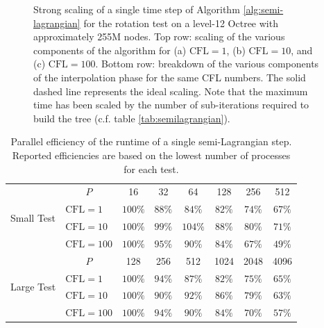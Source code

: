 \begin{figure}[htbp]
\begin{center}
	\end{center}
	\caption{Strong scaling of a single time step of Algorithm \ref{alg:semi-lagrangian} for the rotation test on a level-12 Octree with approximately 255M nodes. Top row: scaling of the various components of the algorithm for (a) $\text{CFL} = 1$, (b) $\text{CFL} = 10$, and (c) $\text{CFL} = 100$. Bottom row: breakdown of the various components of the interpolation phase for the same CFL numbers. The solid dashed line represents the ideal scaling. Note that the maximum time has been scaled by the number of sub-iterations required to build the tree (c.f. table \ref{tab:semilagrangian}).}
	\label{fig:semilagrangian_large}
\end{figure}

\begin{table}
\centering
	\begin{tabular}{|l|l|cccccc|}
	\hline
	\multirow{4}{*}{Small Test} & \multicolumn{1}{|c|}{$P$} & 16      & 32      & 64      & 128     & 256    & 512 \\
	\cline{2-8} 	                            
	                            & $\text{CFL} = 1$   & $100\%$ & $88\%$  & $84\%$  & $82\%$  & $74\%$ & $67\%$ \\
	                            & $\text{CFL} = 10$  & $100\%$ & $99\%$  & $104\%$ & $88\%$  & $80\%$ & $71\%$ \\ 	                            
	                            & $\text{CFL} = 100$ & $100\%$ & $95\%$  & $90\%$  & $84\%$  & $67\%$ & $49\%$ \\
	\hline
	\multirow{4}{*}{Large Test} & \multicolumn{1}{|c|}{$P$} & 128     & 256     & 512     & 1024    & 2048   & 4096 \\
	\cline{2-8} 	                            
	                            & $\text{CFL} = 1$   & $100\%$ & $94\%$  & $87\%$  & $82\%$  & $75\%$ & $65\%$ \\
	                            & $\text{CFL} = 10$  & $100\%$ & $90\%$  & $92\%$  & $86\%$  & $79\%$ & $63\%$ \\
	                            & $\text{CFL} = 100$ & $100\%$ & $94\%$  & $90\%$  & $84\%$  & $70\%$ & $57\%$ \\
	\hline
	\end{tabular}
	\caption{Parallel efficiency of the runtime of a single semi-Lagrangian step. Reported efficiencies are based on the lowest number of processes for each test.}
	\label{tab:scaling_semilagrangian}
\end{table}

